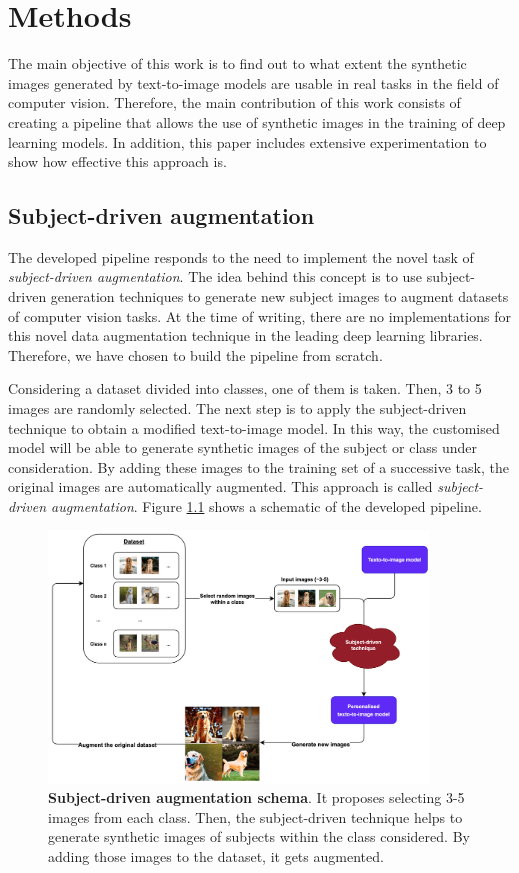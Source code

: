 \chapter{Methods} \label{sec:methods}

The main objective of this work is to find out to what extent the synthetic images generated by text-to-image models are usable in real tasks in the field of computer vision. Therefore, the main contribution of this work consists of creating a pipeline that allows the use of synthetic images in the training of deep learning models. In addition, this paper includes extensive experimentation to show how effective this approach is.

\section{Subject-driven augmentation}

The developed pipeline responds to the need to implement the novel task of \textit{subject-driven augmentation}. The idea behind this concept is to use subject-driven generation techniques to generate new subject images to augment datasets of computer vision tasks. At the time of writing, there are no implementations for this novel data augmentation technique in the leading deep learning libraries. Therefore, we have chosen to build the pipeline from scratch.

Considering a dataset divided into classes, one of them is taken. Then, 3 to 5 images are randomly selected. The next step is to apply the subject-driven technique to obtain a modified text-to-image model. In this way, the customised model will be able to generate synthetic images of the subject or class under consideration. By adding these images to the training set of a successive task, the original images are automatically augmented. This approach is called \textit{subject-driven augmentation}. Figure \ref{fig:subjectDrivenP} shows a schematic of the developed pipeline.

\begin{figure}
    \centering
    \includegraphics[width=0.9\textwidth]{Pictures/subjectDrivenP.png} 
    \caption{\textbf{Subject-driven augmentation schema}.  It proposes selecting 3-5 images from each class. Then, the subject-driven technique helps to generate synthetic images of subjects within the class considered. By adding those images to the dataset, it gets augmented.}
    \label{fig:subjectDrivenP}
\end{figure}

